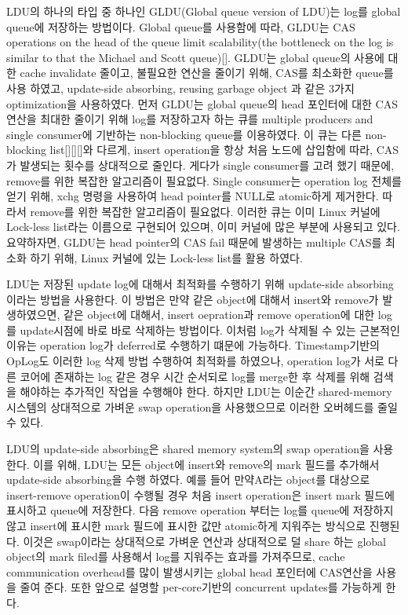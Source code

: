 \ifkor
LDU의 하나의 타입 중 하나인 GLDU(Global queue version of LDU)는 log를 global queue에 저장하는
방법이다.
Global queue를 사용함에 따라, GLDU는 CAS operations on the head of the
queue limit scalability(the bottleneck on the log is similar to that the Michael and Scott
queue)[].
GLDU는 global queue의 사용에 대한 cache invalidate 줄이고, 불필요한 연산을 줄이기 위해, CAS를 최소화한
queue를 사용 하였고, update-side absorbing, reusing garbage object 과 같은  3가지
optimization을 사용하였다.
먼저 GLDU는 global queue의 head 포인터에 대한 CAS 연산을 최대한 줄이기 위해 log를 저장하고자 하는 큐를
multiple producers and single consumer에 기반하는 non-blocking queue를 이용하였다. 
이 큐는 다른 non-blocking list[][][]와 다르게, insert operation을 항상 처음 노드에 삽입함에
따라, CAS가 발생되는 횟수를 상대적으로 줄인다. 
게다가 single consumer를 고려 했기 때문에, remove를 위한 복잡한 알고리즘이 필요없다.
Single consumer는 operation log 전체를 얻기 위해, xchg 명령을 사용하여 head  pointer를 NULL로
atomic하게 제거한다.
따라서 remove를 위한 복잡한 알고리즘이 필요없다.
이러한 큐는 이미 Linux 커널에 Lock-less list라는 이름으로 구현되어 있으며, 이미 커널에 많은 부분에 사용되고 있다.
요약하자면, GLDU는 head pointer의 CAS fail 때문에 발생하는 multiple CAS를 최소화 하기 위해, Linux
커널에 있는 Lock-less list를 활용 하였다.
\else
\fi



\ifkor
LDU는 저장된 update log에 대해서 최적화를 수행하기 위해 update-side absorbing이라는 방법을 사용한다. 
이 방법은 만약 같은 object에 대해서 insert와 remove가 발생하였으면, 같은 object에
대해서, insert oepration과 remove operation에 대한 log를 update시점에 바로 바로 삭제하는 방법이다. 
이처럼 log가 삭제될 수 있는 근본적인 이유는 operation log가 deferred로 수행하기 떄문에 가능하다. 
Timestamp기반의 OpLog도 이러한 log 삭제 방법 수행하여 최적화를 하였으나, operation log가 서로 다른 코어에 존재하는
log 같은 경우 시간 순서되로 log를 merge한 후 삭제를 위해 검색을 해야하는 추가적인 작업을 수행해야 한다.
하지만 LDU는 이순간 shared-memory 시스템의 상대적으로 가벼운 swap operation을 사용했으므로 이러한 오버헤드를 줄일 수
있다. 

LDU의 update-side absorbing은 shared memory system의 swap operation을 사용한다.
이를 위해, LDU는 모든 object에 insert와 remove의 mark 필드를 추가해서 update-side
absorbing을 수행 하였다.
예를 들어 만약A라는 object를 대상으로 insert-remove operation이 수행될 경우 처음 insert operation은
insert mark 필드에 표시하고 queue에 저장한다.
다음 remove operation 부터는 log를 queue에 저장하지 않고 insert에 표시한 mark 필드에 표시한 값만
atomic하게 지워주는 방식으로 진행된다.
이것은 swap이라는 상대적으로 가벼운 연산과 상대적으로 덜 share 하는 global object의 mark filed를 사용해서 log를
지워주는 효과를 가져주므로, cache communication overhead를 많이 발생시키는 global head 포인터에 CAS연산을 사용을 줄여
준다. 
또한 앞으로 설명할 per-core기반의 concurrent updates를 가능하게 한다.

